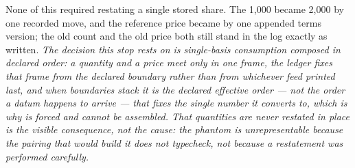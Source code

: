 None of this required restating a single stored share. The 1{,}000 became 2{,}000 by
one recorded move, and the reference price became  by one appended terms
version; the old count and the old price both still stand in the log exactly as
written. \emph{The decision this stop rests on is single-basis consumption composed in
declared order: a quantity and a price meet only in one frame, the ledger fixes that
frame from the declared boundary rather than from whichever feed printed last, and when
boundaries stack it is the declared effective order --- not the order a datum happens to
arrive --- that fixes the single number it converts to, which is why  is forced
and  cannot be assembled. That quantities are never restated in place is the
visible consequence, not the cause: the phantom is unrepresentable because the pairing
that would build it does not typecheck, not because a restatement was performed
carefully.}
